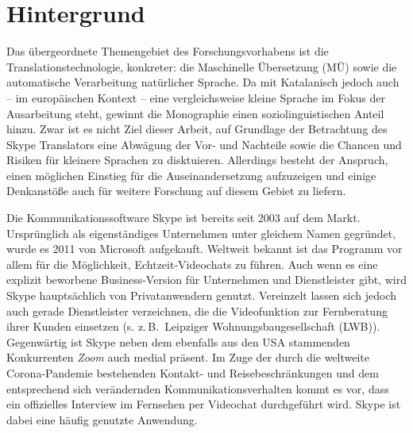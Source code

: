 
\section{Hintergrund}
\label{K1:sec:Hintergrund}\largerpage


Das übergeordnete Themengebiet des Forschungsvorhabens ist die Translationstechnologie, konkreter: die Maschinelle Übersetzung (MÜ) sowie die automatische Verarbeitung natürlicher Sprache. Da mit Katalanisch jedoch auch -- im europäischen Kontext -- eine vergleichsweise \glqq kleine\grqq{} Sprache im Fokus der Ausarbeitung steht, gewinnt die Monographie einen soziolinguistischen Anteil hinzu. Zwar ist es nicht Ziel dieser Arbeit, auf Grundlage der Betrachtung des Skype Translators eine Abwägung der Vor- und Nachteile sowie die Chancen und Risiken für kleinere Sprachen zu disktuieren. Allerdings besteht der Anspruch, einen möglichen Einstieg für die Auseinandersetzung aufzuzeigen und einige Denkanstöße auch für weitere Forschung auf diesem Gebiet zu liefern.

Die Kommunikationssoftware Skype ist bereits seit 2003 auf dem Markt. Ursprünglich als eigenständiges Unternehmen unter gleichem Namen gegründet, wurde es 2011 von Microsoft aufgekauft. Weltweit bekannt ist das Programm vor allem für die Möglichkeit, Echtzeit-Videochats zu führen. Auch wenn es eine explizit beworbene Business-Version für Unternehmen und Dienstleister gibt, wird Skype hauptsächlich von Privatanwendern genutzt. Vereinzelt lassen sich jedoch auch gerade Dienstleister verzeichnen, die die Videofunktion zur Fernberatung ihrer Kunden einsetzen (s. z.\,B.\ Leipziger Wohnungsbaugesellschaft (LWB)). Gegenwärtig ist Skype neben dem ebenfalls aus den USA stammenden Konkurrenten \emph{Zoom} auch medial präsent. Im Zuge der durch die weltweite Corona-Pandemie bestehenden Kontakt- und Reisebeschränkungen und dem entsprechend sich verändernden Kommunikationsverhalten kommt es vor, dass ein offizielles Interview im Fernsehen per Videochat durchgeführt wird. Skype ist dabei eine häufig genutzte Anwendung.

